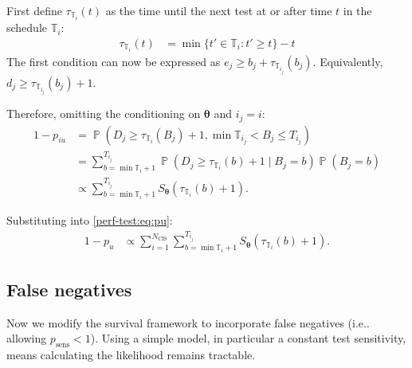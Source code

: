 \documentclass[12pt]{article}
\makeatletter
\DeclareMathOperator{\prob}{\mathbb{P}}
\renewcommand{\vec}[1]{\bm{#1}}
\newcommand{\ssep}{:}
\newcommand{\psens}{p_\text{sens}}
\newcommand{\Ncis}{N_\text{CIS}}
\newcommand{\sched}{\mathbb{T}}
\DeclareRobustCommand\onedot{\futurelet\@let@token\@onedot}
\def\@onedot{\ifx\@let@token.\else.\null\fi\xspace}
\def\ie{i.e\onedot} \def\Ie{{I.e}\onedot}
\makeatother
\begin{document}
First define $\tau_{\sched_i}(t)$ as the time until the next test at or after time $t$ in the schedule $\sched_i$:
\begin{align}
\tau_{\sched_i}(t) &= \min \{ t' \in \sched_i : t' \geq t \} - t
\label{perf-test:eq:tau-def}
\end{align}
The first condition can now be expressed as $e_j \geq b_j + \tau_{\sched_{i_j}}(b_j)$.
Equivalently, $d_j \geq \tau_{\sched_{i_j}}(b_j) + 1$.


Therefore, omitting the conditioning on $\vec{\theta}$ and $i_j = i$:
\begin{align}
1 - p_{iu}
&= \prob(D_j \geq \tau_{\sched_{i}}(B_j)+ 1, \min \sched_{i_j} < B_j \leq T_{i_j}) \\
&= \sum_{b = \min \sched_{i} + 1}^{T_{i_j}} \prob(D_j \geq \tau_{\sched_{i}}(b) + 1 \mid B_j = b) \prob(B_j = b)\\
&\propto \sum_{b = \min \sched_{i} + 1}^{T_{i_j}} S_{\vec{\theta}}(\tau_{\sched_{i}}(b) + 1).
\label{perf-test:eq:piu}
\end{align}

Substituting into \cref{perf-test:eq:pu}:
\begin{align}
1 - p_u
& \propto \sum_{i=1}^{\Ncis} \sum_{b = \min \sched_{i} + 1}^{T_{i_j}} S_{\vec{\theta}}(\tau_{\sched_{i}}(b) + 1).
\end{align}

\subsection{False negatives}

Now we modify the survival framework to incorporate false negatives (\ie allowing $\psens < 1$).
Using a simple model, in particular a constant test sensitivity, means calculating the likelihood remains tractable.
\end{document}

